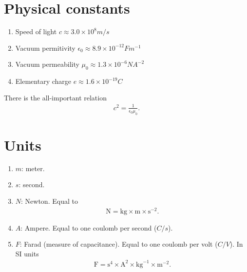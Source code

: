 \documentclass[12pt]{report}
\begin{document}
\section{Physical constants}
\begin{enumerate}
    \item Speed of light $c\approx 3.0 \times 10^8 m/s$
    \item Vacuum permitivity $\epsilon_0\approx 8.9 \times 10^{-12} F m^{-1}$
    \item Vacuum permeability $\mu_0\approx 1.3\times 10^{-6} N A^{-2}$
    \item Elementary charge $e\approx 1.6\times 10^{-19}C$
\end{enumerate}

There is the all-important relation
\begin{align}
    c^2
    =
    \frac{1}{\epsilon_0\mu_0}
    .
\end{align}

\section{Units}
\begin{enumerate}
    \item $m$: meter. 
    \item $s$: second. 
    \item $N$: Newton.
        Equal to 
        \begin{align}
            \mathrm{N}
            =
            \mathrm{kg} \times \mathrm{m} \times \mathrm{s}^{-2}
            .
        \end{align}
    \item $A$: Ampere. Equal to one coulomb per second ($C/s$).
    \item $F$: Farad (measure of capacitance). Equal to one coulomb per volt ($C/V$).
        In SI units
        \begin{align}
            \mathrm{F} = \mathrm{s}^4\times \mathrm{A}^2 \times \mathrm{kg}^{-1} \times \mathrm{m}^{-2}
            .
        \end{align}
\end{enumerate}
%
%
\end{document}
